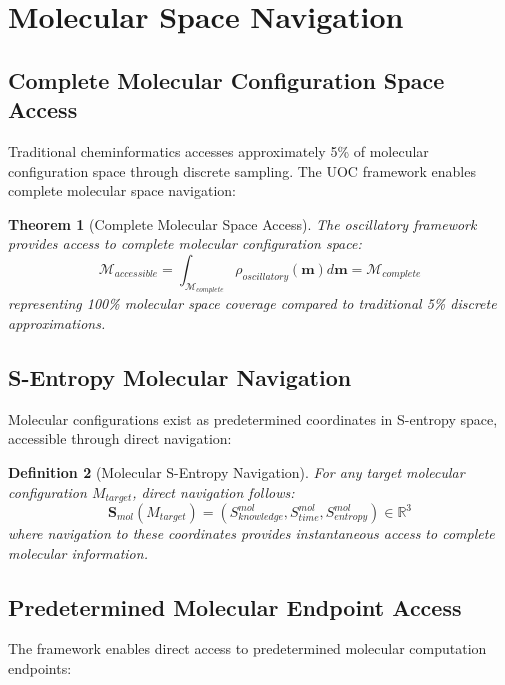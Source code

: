 \documentclass[12pt,a4paper]{article}
\newtheorem{theorem}{Theorem}[section]
\newtheorem{definition}[theorem]{Definition}
\begin{document}
\section{Molecular Space Navigation}

\subsection{Complete Molecular Configuration Space Access}

Traditional cheminformatics accesses approximately 5\% of molecular configuration space through discrete sampling. The UOC framework enables complete molecular space navigation:

\begin{theorem}[Complete Molecular Space Access]
The oscillatory framework provides access to complete molecular configuration space:
\begin{equation}
\mathcal{M}_{accessible} = \int_{\mathcal{M}_{complete}} \rho_{oscillatory}(\mathbf{m}) d\mathbf{m} = \mathcal{M}_{complete}
\end{equation}
representing 100\% molecular space coverage compared to traditional 5\% discrete approximations.
\end{theorem}

\subsection{S-Entropy Molecular Navigation}

Molecular configurations exist as predetermined coordinates in S-entropy space, accessible through direct navigation:

\begin{definition}[Molecular S-Entropy Navigation]
For any target molecular configuration $M_{target}$, direct navigation follows:
\begin{equation}
\mathbf{S}_{mol}(M_{target}) = (S_{knowledge}^{mol}, S_{time}^{mol}, S_{entropy}^{mol}) \in \mathbb{R}^3
\end{equation}
where navigation to these coordinates provides instantaneous access to complete molecular information.
\end{definition}

\subsection{Predetermined Molecular Endpoint Access}

The framework enables direct access to predetermined molecular computation endpoints:
\end{document}

